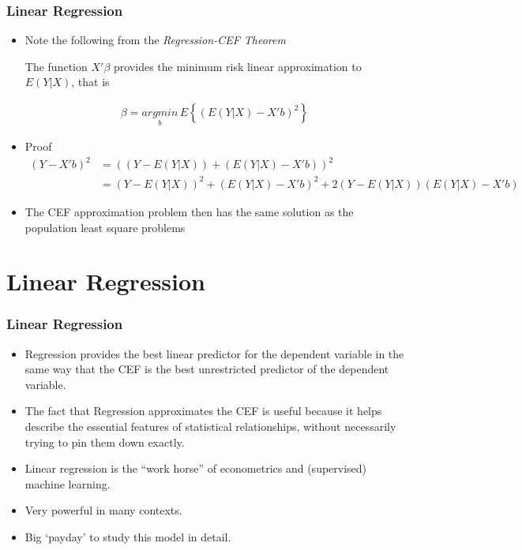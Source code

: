 \documentclass[
  shownotes,
  xcolor={svgnames},
  hyperref={colorlinks,citecolor=DarkBlue,linkcolor=DarkRed,urlcolor=DarkBlue}
  , aspectratio=169]{beamer}
\begin{document}
\begin{frame}
\frametitle{Linear Regression}

\begin{itemize}
\item Note the following from the {\it Regression-CEF Theorem}

The function $X'\beta$ provides the minimum risk  linear approximation to $E(Y|X)$, that is

\begin{align}
\beta = \underset{b}{argmin}\,E\left\{ (E(Y|X) - X'b)^2 \right\}
\end{align}

\item Proof 
\begin{align}
(Y - X'b)^2 &= {((Y- E(Y|X))+ (E(Y|X) - X'b))}^2 \\
            &= (Y- E(Y|X))^2+ (E(Y|X) - X'b)^2 + 2 (Y- E(Y|X))(E(Y|X) - X'b)
\end{align}

\item The CEF approximation problem then has the same solution as the population least square problems


\end{itemize}
\end{frame}

\section{Linear Regression}
\begin{frame}
\frametitle{Linear Regression}

\begin{itemize}


  \item Regression provides the best linear predictor for the dependent variable in the same way that the CEF is the best unrestricted predictor of the dependent variable. 
  \medskip
  

  \item The fact that Regression approximates the CEF is useful because it helps describe the essential features of statistical relationships, without necessarily trying to pin them down exactly. 
  \medskip

  \item Linear regression is the “work horse” of econometrics and (supervised) machine learning. 
  \medskip
  \item Very powerful in many contexts.
  \medskip
  \item Big `payday' to study this model in detail.
\end{itemize}
\end{frame}
\end{document}
